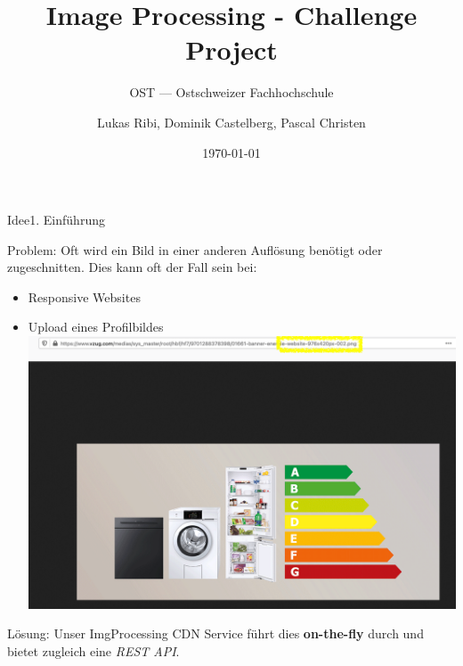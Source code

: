 \documentclass[aspectratio=169,20pt]{beamer}
\title{Image Processing - Challenge Project}
\subtitle{OST — Ostschweizer Fachhochschule}
\date{\today}
\author{Lukas Ribi, Dominik Castelberg, Pascal Christen}
\institute{DS1 - Thomas Bocek }
\begin{document}
\begin{frame}
	\titlepage
\end{frame}

\begin{frame}{Idee}{1. Einführung}
		
	Problem: Oft wird ein Bild in einer anderen Auflösung benötigt oder zugeschnitten.
	Dies kann oft der Fall sein bei:
		
	\begin{itemize}
		\item{Responsive Websites}	
		\item{Upload eines Profilbildes}
		\includegraphics[scale=0.25]{vzug}
	\end{itemize}
		
	Lösung: Unser ImgProcessing CDN Service führt dies \textbf{on-the-fly} durch und bietet zugleich eine \textit{REST API}.
		
\end{frame}
\end{document}

